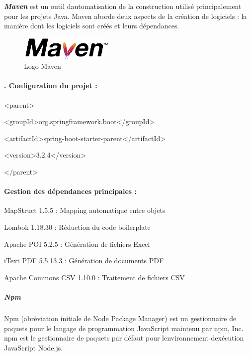 \documentclass[12pt,a4paper,twoside,openright]{report}
\begin{document}
\emph{\textbf{Maven}} est un outil d\textquotesingle automatisation de
la construction utilisé principalement pour les projets Java. Maven
aborde deux aspects de la création de logiciels : la manière dont les
logiciels sont créés et leurs dépendances.

\begin{figure}[H]
\centering
\includegraphics[width=0.4\textwidth]{latex_media/media/image27.png}
\caption{Logo Maven}
\label{fig:logo-maven}
\end{figure}

\hypertarget{configuration-du-projet}{%
\paragraph{. Configuration du projet :}\label{configuration-du-projet}}

\textless parent\textgreater{}

\textless groupId\textgreater org.springframework.boot\textless/groupId\textgreater{}

\textless artifactId\textgreater spring-boot-starter-parent\textless/artifactId\textgreater{}

\textless version\textgreater3.2.4\textless/version\textgreater{}

\textless/parent\textgreater{}

\hypertarget{gestion-des-duxe9pendances-principales}{%
\paragraph{Gestion des dépendances principales
:}\label{gestion-des-duxe9pendances-principales}}

MapStruct 1.5.5 : Mapping automatique entre objets

Lombok 1.18.30 : Réduction du code boilerplate

Apache POI 5.2.5 : Génération de fichiers Excel

iText PDF 5.5.13.3 : Génération de documents PDF

Apache Commons CSV 1.10.0 : Traitement de fichiers CSV

\hypertarget{npm}{%
\subparagraph{Npm}\label{npm}}

Npm (abréviation initiale de Node Package Manager) est un gestionnaire
de paquets pour le langage de programmation JavaScript maintenu par npm,
Inc. npm est le gestionnaire de paquets par défaut pour
l\textquotesingle environnement d\textquotesingle exécution JavaScript
Node.js.
\end{document}
